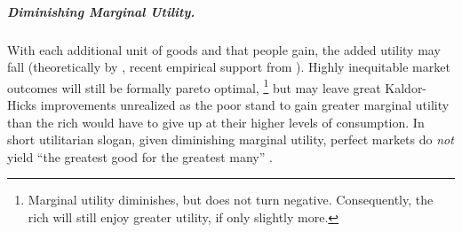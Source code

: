 \subparagraph{Diminishing Marginal Utility.} \label{sec:diminishing-marginal-utility} With each additional unit of goods and that people gain, the added utility may fall (theoretically by \citealt[23]{Lerner1944}, recent empirical support from \citealt{Ng-1997-aa,Veenhoven-2000-aa,Nickell2008}).
Highly inequitable market outcomes will still be formally pareto optimal,
\footnote{
	Marginal utility diminishes, but does not turn negative.
	Consequently, the rich will still enjoy greater utility, if only slightly more.
}
but may leave great Kaldor-Hicks improvements unrealized as the poor stand to gain greater marginal utility than the rich would have to give up at their higher levels of consumption.
In short utilitarian slogan, given diminishing marginal utility, perfect markets do \emph{not} yield ``the greatest good for the greatest many'' \citep{Mill1863}.


